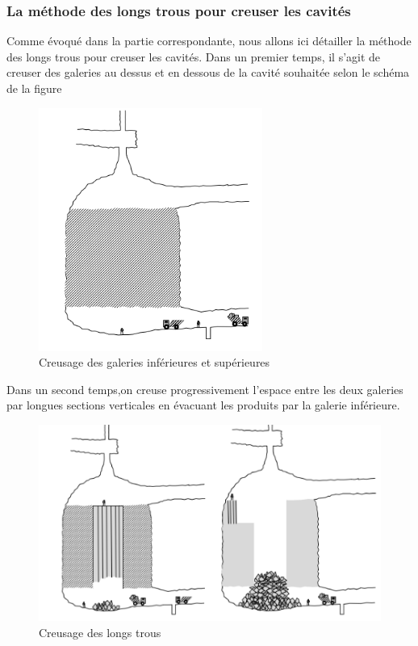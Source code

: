 \documentclass[11pt,french,a4paper]{article}
\begin{document}
\FloatBarrier
\subsubsection*{La méthode des longs trous pour creuser les cavités}
Comme évoqué dans la partie correspondante, nous allons ici détailler la méthode des longs trous pour creuser les cavités.
Dans un premier temps, il s’agit de creuser des galeries au dessus et en dessous de la cavité souhaitée selon le schéma de la figure

\begin{figure}[!h]
  \centering
  \includegraphics[width=.5\linewidth]{image/annexe/chap2/figure4iiacreusagegalerie.png}
  \caption{Creusage des galeries inférieures et supérieures}
  \end{figure}

Dans un second temps,on creuse progressivement l’espace entre les deux galeries par longues sections verticales en évacuant les produits par la galerie inférieure.

\begin{figure}[!h]
  \centering
  \includegraphics[width=.8\linewidth]{image/annexe/chap2/figure4iibcreusagegalerie.png}
  \caption{Creusage des longs trous}
  \end{figure}
\end{document}
